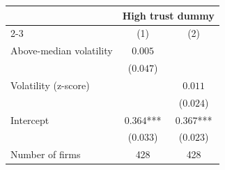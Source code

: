 \begin{tabular}[t]{lcc}
\toprule
  & \multicolumn{2}{c}{High trust dummy} \\
  \cmidrule(lr){2-3}
  & (1) & (2) \\
\midrule
Above-median volatility & $0.005$ & \\
 & ($0.047$) & \\
Volatility (z-score) &  & $0.011$\\
 &  & ($0.024$)\\
Intercept & $0.364$*** & $0.367$***\\
 & ($0.033$) & ($0.023$)\\
\midrule
Number of firms & 428 & 428\\
\bottomrule
\end{tabular}
